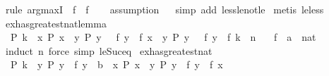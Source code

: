 \begin{isabellebody}
%
\isadelimproof
%
\endisadelimproof
%
\isatagproof
{}\isamarkupfalse%
\ {\isacharparenleft}{\kern0pt}rule\ arg{\isacharunderscore}{\kern0pt}maxI\ {\isacharbrackleft}{\kern0pt}\ f\ {\isacharequal}{\kern0pt}\ f{\isacharbrackright}{\kern0pt}{\isacharparenright}{\kern0pt}\isanewline
\ \ \isamarkupfalse%
\ assumption\isanewline
\ \isamarkupfalse%
\ {\isacharparenleft}{\kern0pt}simp\ add{\isacharcolon}{\kern0pt}\ less{\isacharunderscore}{\kern0pt}le{\isacharunderscore}{\kern0pt}not{\isacharunderscore}{\kern0pt}le{\isacharparenright}{\kern0pt}\isanewline
{}\isamarkupfalse%
\ {\isacharparenleft}{\kern0pt}metis\ le{\isacharunderscore}{\kern0pt}less{\isacharparenright}{\kern0pt}%
\endisatagproof
{\isafoldproof}%
%
\isadelimproof
\isanewline
%
\endisadelimproof
\isanewline
{}\isamarkupfalse%
\ ex{\isacharunderscore}{\kern0pt}has{\isacharunderscore}{\kern0pt}greatest{\isacharunderscore}{\kern0pt}nat{\isacharunderscore}{\kern0pt}lemma{\isacharcolon}{\kern0pt}\isanewline
\ \ {\isachardoublequoteopen}P\ k\ {\isasymLongrightarrow}\ {\isasymforall}x{\isachardot}{\kern0pt}\ P\ x\ {\isasymlongrightarrow}\ {\isacharparenleft}{\kern0pt}{\isasymexists}y{\isachardot}{\kern0pt}\ P\ y\ {\isasymand}\ {\isasymnot}\ f\ y\ {\isasymle}\ f\ x{\isacharparenright}{\kern0pt}\ {\isasymLongrightarrow}\ {\isasymexists}y{\isachardot}{\kern0pt}\ P\ y\ {\isasymand}\ {\isasymnot}\ f\ y\ {\isacharless}{\kern0pt}\ f\ k\ {\isacharplus}{\kern0pt}\ n{\isachardoublequoteclose}\isanewline
\ \ \ f\ {\isacharcolon}{\kern0pt}{\isacharcolon}{\kern0pt}\ {\isachardoublequoteopen}{\isacharprime}{\kern0pt}a\ {\isasymRightarrow}\ nat{\isachardoublequoteclose}\isanewline
%
\isadelimproof
%
\endisadelimproof
%
\isatagproof
{}\isamarkupfalse%
\ {\isacharparenleft}{\kern0pt}induct\ n{\isacharparenright}{\kern0pt}\ {\isacharparenleft}{\kern0pt}force\ simp{\isacharcolon}{\kern0pt}\ le{\isacharunderscore}{\kern0pt}Suc{\isacharunderscore}{\kern0pt}eq{\isacharparenright}{\kern0pt}{\isacharplus}{\kern0pt}%
\endisatagproof
{\isafoldproof}%
%
\isadelimproof
\isanewline
%
\endisadelimproof
\isanewline
{}\isamarkupfalse%
\ ex{\isacharunderscore}{\kern0pt}has{\isacharunderscore}{\kern0pt}greatest{\isacharunderscore}{\kern0pt}nat{\isacharcolon}{\kern0pt}\isanewline
\ \ {\isachardoublequoteopen}P\ k\ {\isasymLongrightarrow}\ {\isasymforall}y{\isachardot}{\kern0pt}\ P\ y\ {\isasymlongrightarrow}\ f\ y\ {\isacharless}{\kern0pt}\ b\ {\isasymLongrightarrow}\ {\isasymexists}x{\isachardot}{\kern0pt}\ P\ x\ {\isasymand}\ {\isacharparenleft}{\kern0pt}{\isasymforall}y{\isachardot}{\kern0pt}\ P\ y\ {\isasymlongrightarrow}\ f\ y\ {\isasymle}\ f\ x{\isacharparenright}{\kern0pt}{\isachardoublequoteclose}\isanewline

\end{isabellebody}

